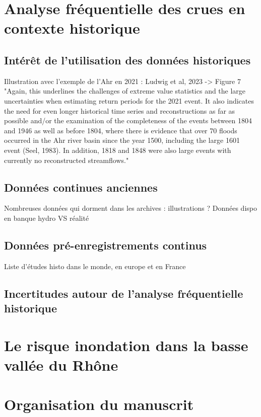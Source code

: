 \documentclass[11pt]{article}
\begin{document}
\section{Analyse fréquentielle des crues en contexte historique}
		\subsection{Intérêt de l'utilisation des données historiques}
		
		Illustration avec l'exemple de l'Ahr en 2021 : Ludwig et al, 2023 -> Figure 7
		"Again, this underlines the challenges of extreme value
statistics and the large uncertainties when estimating return
periods for the 2021 event. It also indicates the need for
even longer historical time series and reconstructions as far
as possible and/or the examination of the completeness of
the events between 1804 and 1946 as well as before 1804,
where there is evidence that over 70 floods occurred in the
Ahr river basin since the year 1500, including the large 1601
event (Seel, 1983). In addition, 1818 and 1848 were also
large events with currently no reconstructed streamflows."
		
		\subsection{Données continues anciennes}
		Nombreuses données qui dorment dans les archives : illustrations ? Données dispo en banque hydro VS réalité
		\subsection{Données pré-enregistrements continus}
		Liste d'études histo dans le monde, en europe et en France
		\subsection{Incertitudes autour de l'analyse fréquentielle historique}
		
\section{Le risque inondation dans la basse vallée  du Rhône}

\section{Organisation du manuscrit}






\printbibliography
\end{document}
